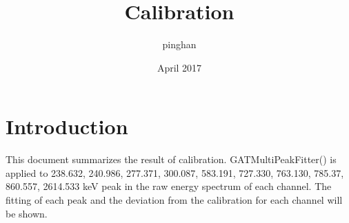 \documentclass{article}
\title{Calibration}
\author{pinghan }
\date{April 2017}
\begin{document}
\maketitle
\section{Introduction}
This document summarizes the result of calibration. GATMultiPeakFitter() is applied to 238.632, 240.986, 277.371, 300.087, 583.191, 727.330, 763.130, 785.37, 860.557, 2614.533 keV peak in the raw energy spectrum of each channel. The fitting of each peak and the deviation from the calibration for each channel will be shown. 

%
%
\end{document}
